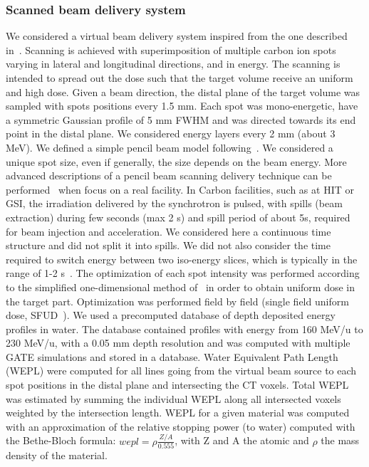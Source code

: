 \documentclass[11pt]{iopart}
\begin{document}
\subsubsection{Scanned beam delivery system}

We considered a virtual beam delivery system inspired from the one
described in~\cite{Kramer2000a}. Scanning is achieved with
superimposition of multiple carbon ion spots varying in lateral and
longitudinal directions, and in energy. The scanning is intended to
spread out the dose such that the target volume receive an uniform and
high dose.  Given a beam direction, the distal plane of the target
volume was sampled with spots positions every 1.5 mm. Each spot was
mono-energetic, have a symmetric Gaussian profile of 5 mm FWHM and was
directed towards its end point in the distal plane. We considered
energy layers every 2 mm (about 3 MeV). We defined a simple pencil
beam model following~\cite{Grevillot2010}. We considered a unique spot
size, even if generally, the size depends on the beam energy. More
advanced descriptions of a pencil beam scanning delivery technique can
be performed~\cite{Grevillot2011} when focus on a real facility. In
Carbon facilities, such as at HIT or GSI, the irradiation delivered by
the synchrotron is pulsed, with spills (beam extraction) during few
seconds (max 2 s) and spill period of about 5s, required for beam
injection and acceleration. We considered here a continuous time
structure and did not split it into spills. We did not also consider
the time required to switch energy between two iso-energy slices,
which is typically in the range of 1-2 s~\cite{Rietzel2010}. The
optimization of each spot intensity was performed according to the
simplified one-dimensional method of~\cite{Kramer2000a} in order to
obtain uniform dose in the target part. Optimization was performed
field by field (single field uniform dose, SFUD~\cite{Lomax1999}). We
used a precomputed database of depth deposited energy profiles in
water. The database contained profiles with energy from 160 MeV/u to
230 MeV/u, with a 0.05 mm depth resolution and was computed with
multiple GATE simulations and stored in a database. Water Equivalent
Path Length (WEPL) were computed for all lines going from the virtual
beam source to each spot positions in the distal plane and
intersecting the CT voxels. Total WEPL was estimated by summing the
individual WEPL along all intersected voxels weighted by the
intersection length. WEPL for a given material was computed with an
approximation of the relative stopping power (to water) computed with
the Bethe-Bloch formula: $wepl = \rho \frac{Z/A}{0.555}$, with Z and A
the atomic and $\rho$ the mass density of the material.
\end{document}
